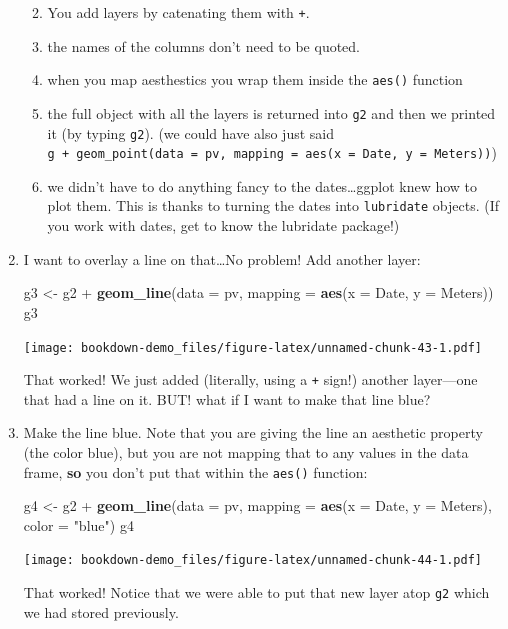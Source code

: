 \documentclass[]{book}
\newenvironment{Shaded}{\begin{snugshade}}{\end{snugshade}}
\newcommand{\KeywordTok}[1]{\textcolor[rgb]{0.13,0.29,0.53}{\textbf{{#1}}}}
\newcommand{\DataTypeTok}[1]{\textcolor[rgb]{0.13,0.29,0.53}{{#1}}}
\newcommand{\StringTok}[1]{\textcolor[rgb]{0.31,0.60,0.02}{{#1}}}
\newcommand{\NormalTok}[1]{{#1}}
\providecommand{\tightlist}{%
  \setlength{\itemsep}{0pt}\setlength{\parskip}{0pt}}
\theoremstyle{definition}
\theoremstyle{definition}
\theoremstyle{remark}
\begin{document}
\begin{enumerate}
  \begin{enumerate}
  \def\labelenumii{\alph{enumii}.}
  \tightlist
  \item
    You add layers by catenating them with \texttt{+}.
  \item
    the names of the columns don't need to be quoted.
  \item
    when you map aesthestics you wrap them inside the \texttt{aes()}
    function
  \item
    the full object with all the layers is returned into \texttt{g2} and
    then we printed it (by typing \texttt{g2}). (we could have also just
    said
    \texttt{g\ +\ geom\_point(data\ =\ pv,\ mapping\ =\ aes(x\ =\ Date,\ y\ =\ Meters))})
  \item
    we didn't have to do anything fancy to the dates\ldots{}ggplot knew
    how to plot them. This is thanks to turning the dates into
    \texttt{lubridate} objects. (If you work with dates, get to know the
    lubridate package!)
  \end{enumerate}
\item
  I want to overlay a line on that\ldots{}No problem! Add another layer:

\begin{Shaded}
\begin{Highlighting}[]
\NormalTok{g3 <-}\StringTok{ }\NormalTok{g2 +}\StringTok{ }\KeywordTok{geom_line}\NormalTok{(}\DataTypeTok{data =} \NormalTok{pv, }\DataTypeTok{mapping =} \KeywordTok{aes}\NormalTok{(}\DataTypeTok{x =} \NormalTok{Date, }\DataTypeTok{y =} \NormalTok{Meters))}
\NormalTok{g3}
\end{Highlighting}
\end{Shaded}

  \texttt{[image: bookdown-demo\_files/figure-latex/unnamed-chunk-43-1.pdf]}

  That worked! We just added (literally, using a \texttt{+} sign!)
  another layer---one that had a line on it. BUT! what if I want to make
  that line blue?
\item
  Make the line blue. Note that you are giving the line an aesthetic
  property (the color blue), but you are not mapping that to any values
  in the data frame, \textbf{so} you don't put that within the
  \texttt{aes()} function:

\begin{Shaded}
\begin{Highlighting}[]
\NormalTok{g4 <-}\StringTok{ }\NormalTok{g2 +}\StringTok{ }\KeywordTok{geom_line}\NormalTok{(}\DataTypeTok{data =} \NormalTok{pv, }\DataTypeTok{mapping =} \KeywordTok{aes}\NormalTok{(}\DataTypeTok{x =} \NormalTok{Date, }\DataTypeTok{y =} \NormalTok{Meters), }\DataTypeTok{color =} \StringTok{"blue"}\NormalTok{)}
\NormalTok{g4}
\end{Highlighting}
\end{Shaded}

  \texttt{[image: bookdown-demo\_files/figure-latex/unnamed-chunk-44-1.pdf]}

  That worked! Notice that we were able to put that new layer atop
  \texttt{g2} which we had stored previously.
\end{enumerate}
\end{document}
